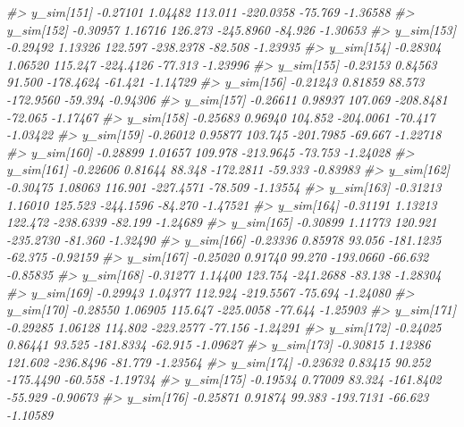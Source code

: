 \documentclass[
  10pt,
  italian,
  a4paper,
  extrafontsizes,onecolumn,openright
  ]{memoir}
\newenvironment{Shaded}{\begin{snugshade}}{\end{snugshade}}
\newcommand{\CommentTok}[1]{\textcolor[rgb]{0.56,0.35,0.01}{\textit{#1}}}
\begin{document}
\begin{Shaded}
\begin{Highlighting}[]
\CommentTok{\#\textgreater{} y\_sim[151] {-}0.27101 1.04482 113.011 {-}220.0358 {-}75.769 {-}1.36588}
\CommentTok{\#\textgreater{} y\_sim[152] {-}0.30957 1.16716 126.273 {-}245.8960 {-}84.926 {-}1.30653}
\CommentTok{\#\textgreater{} y\_sim[153] {-}0.29492 1.13326 122.597 {-}238.2378 {-}82.508 {-}1.23935}
\CommentTok{\#\textgreater{} y\_sim[154] {-}0.28304 1.06520 115.247 {-}224.4126 {-}77.313 {-}1.23996}
\CommentTok{\#\textgreater{} y\_sim[155] {-}0.23153 0.84563  91.500 {-}178.4624 {-}61.421 {-}1.14729}
\CommentTok{\#\textgreater{} y\_sim[156] {-}0.21243 0.81859  88.573 {-}172.9560 {-}59.394 {-}0.94306}
\CommentTok{\#\textgreater{} y\_sim[157] {-}0.26611 0.98937 107.069 {-}208.8481 {-}72.065 {-}1.17467}
\CommentTok{\#\textgreater{} y\_sim[158] {-}0.25683 0.96940 104.852 {-}204.0061 {-}70.417 {-}1.03422}
\CommentTok{\#\textgreater{} y\_sim[159] {-}0.26012 0.95877 103.745 {-}201.7985 {-}69.667 {-}1.22718}
\CommentTok{\#\textgreater{} y\_sim[160] {-}0.28899 1.01657 109.978 {-}213.9645 {-}73.753 {-}1.24028}
\CommentTok{\#\textgreater{} y\_sim[161] {-}0.22606 0.81644  88.348 {-}172.2811 {-}59.333 {-}0.83983}
\CommentTok{\#\textgreater{} y\_sim[162] {-}0.30475 1.08063 116.901 {-}227.4571 {-}78.509 {-}1.13554}
\CommentTok{\#\textgreater{} y\_sim[163] {-}0.31213 1.16010 125.523 {-}244.1596 {-}84.270 {-}1.47521}
\CommentTok{\#\textgreater{} y\_sim[164] {-}0.31191 1.13213 122.472 {-}238.6339 {-}82.199 {-}1.24689}
\CommentTok{\#\textgreater{} y\_sim[165] {-}0.30899 1.11773 120.921 {-}235.2730 {-}81.360 {-}1.32490}
\CommentTok{\#\textgreater{} y\_sim[166] {-}0.23336 0.85978  93.056 {-}181.1235 {-}62.375 {-}0.92159}
\CommentTok{\#\textgreater{} y\_sim[167] {-}0.25020 0.91740  99.270 {-}193.0660 {-}66.632 {-}0.85835}
\CommentTok{\#\textgreater{} y\_sim[168] {-}0.31277 1.14400 123.754 {-}241.2688 {-}83.138 {-}1.28304}
\CommentTok{\#\textgreater{} y\_sim[169] {-}0.29943 1.04377 112.924 {-}219.5567 {-}75.694 {-}1.24080}
\CommentTok{\#\textgreater{} y\_sim[170] {-}0.28550 1.06905 115.647 {-}225.0058 {-}77.644 {-}1.25903}
\CommentTok{\#\textgreater{} y\_sim[171] {-}0.29285 1.06128 114.802 {-}223.2577 {-}77.156 {-}1.24291}
\CommentTok{\#\textgreater{} y\_sim[172] {-}0.24025 0.86441  93.525 {-}181.8334 {-}62.915 {-}1.09627}
\CommentTok{\#\textgreater{} y\_sim[173] {-}0.30815 1.12386 121.602 {-}236.8496 {-}81.779 {-}1.23564}
\CommentTok{\#\textgreater{} y\_sim[174] {-}0.23632 0.83415  90.252 {-}175.4490 {-}60.558 {-}1.19734}
\CommentTok{\#\textgreater{} y\_sim[175] {-}0.19534 0.77009  83.324 {-}161.8402 {-}55.929 {-}0.90673}
\CommentTok{\#\textgreater{} y\_sim[176] {-}0.25871 0.91874  99.383 {-}193.7131 {-}66.623 {-}1.10589}

\end{Highlighting}
\end{Shaded}
\end{document}

